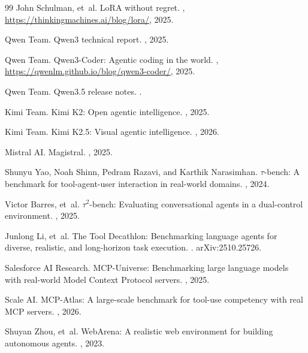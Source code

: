 \documentclass[11pt,a4paper]{article}
\begin{document}
\begin{thebibliography}{99}
John Schulman, et~al.
\newblock LoRA without regret.
, \url{https://thinkingmachines.ai/blog/lora/}, 2025.

Qwen Team.
\newblock Qwen3 technical report.
, 2025.

Qwen Team.
\newblock Qwen3-Coder: Agentic coding in the world.
, \url{https://qwenlm.github.io/blog/qwen3-coder/}, 2025.

Qwen Team.
\newblock Qwen3.5 release notes.
. %

Kimi Team.
\newblock Kimi K2: Open agentic intelligence.
, 2025.

Kimi Team.
\newblock Kimi K2.5: Visual agentic intelligence.
, 2026.

Mistral AI.
\newblock Magistral.
, 2025.

Shunyu Yao, Noah Shinn, Pedram Razavi, and Karthik Narasimhan.
\newblock $\tau$-bench: A benchmark for tool-agent-user interaction in real-world domains.
, 2024.

Victor Barres, et~al.
\newblock $\tau^2$-bench: Evaluating conversational agents in a dual-control environment.
, 2025.

Junlong Li, et~al.
\newblock The Tool Decathlon: Benchmarking language agents for diverse, realistic, and long-horizon task execution.
. arXiv:2510.25726.

Salesforce AI Research.
\newblock MCP-Universe: Benchmarking large language models with real-world Model Context Protocol servers.
, 2025.

Scale AI.
\newblock MCP-Atlas: A large-scale benchmark for tool-use competency with real MCP servers.
, 2026.

Shuyan Zhou, et~al.
\newblock WebArena: A realistic web environment for building autonomous agents.
, 2023.


\end{thebibliography}
\end{document}
